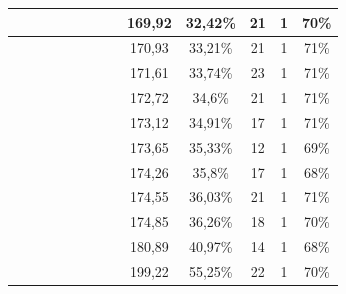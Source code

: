 \begin{center}
\begin{longtable}{|c|c|c|c|c|c|c|c|c|c|c|c|c|}
 \x &  &  &  \x &  \x &  \x &  \x &  \x & 169,92 & 32,42\% & 21 & 1 & 70\% \\ \hline
 \x &  \x &  &  \x &  &  \x &  \x &  & 170,93 & 33,21\% & 21 & 1 & 71\% \\ \hline
 \x &  &  \x &  \x &  \x &  \x &  \x &  \x & 171,61 & 33,74\% & 23 & 1 & 71\% \\ \hline
 \x &  &  \x &  \x &  &  \x &  \x &  & 172,72 & 34,6\% & 21 & 1 & 71\% \\ \hline
 \x &  &  &  &  \x &  \x &  \x &  & 173,12 & 34,91\% & 17 & 1 & 71\% \\ \hline
 \x &  &  \x &  \x &  &  \x &  \x &  \x & 173,65 & 35,33\% & 12 & 1 & 69\% \\ \hline
 \x &  \x &  \x &  \x &  \x &  \x &  \x &  \x & 174,26 & 35,8\% & 17 & 1 & 68\% \\ \hline
 \x &  \x &  &  \x &  &  \x &  \x &  \x & 174,55 & 36,03\% & 21 & 1 & 71\% \\ \hline
 \x &  &  &  \x &  &  \x &  \x &  \x & 174,85 & 36,26\% & 18 & 1 & 70\% \\ \hline
 \x &  \x &  \x &  &  \x &  \x &  \x &  & 180,89 & 40,97\% & 14 & 1 & 68\% \\ \hline
 \x &  \x &  &  &  \x &  \x &  \x &  \x & 199,22 & 55,25\% & 22 & 1 & 70\% \\ \hline
\end{longtable}
\label{table:windProdInputParamsAppendix}
\end{center}
\normalsize

